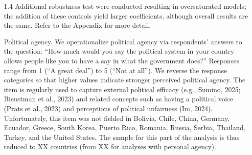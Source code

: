 \documentclass[10pt, letterpaper]{article}
\begin{document}
\begin{spacing}{1.4}
Additional robustness test were conducted resulting in oversaturated models; the addition of these controls yield larger coefficients, although overall results are the same. Refer to the Appendix for more detail.

Political agency. We operationalize political agency via respondents' answers to
the question: ``How much would you say the political system in your country
allows people like you to have a say in what the government does?'' Responses
range from 1 (``A great deal'') to 5 (``Not at all''). We reverse the response
categories so that higher values indicate stronger perceived political
agency. The item is regularly used to capture external political efficacy (e.g.,
Sumino, 2025; Bienstman et al., 2023) and related concepts such as having a
political voice (Prats et al., 2023) and perceptions of political unfairness
(Im, 2024). Unfortunately, this item was not fielded in Bolivia, Chile, China,
Germany, Ecuador, Greece, South Korea, Puerto Rico, Romania, Russia, Serbia,
Thailand, Turkey, and the United States. The sample for this part of the
analysis is thus reduced to XX countries (from XX for analyses with personal agency).


\end{spacing}
\end{document}
